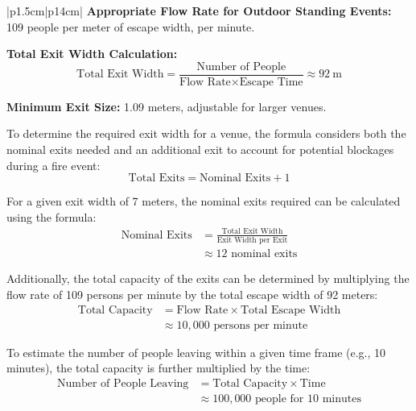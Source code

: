 \begin{longtable}{|p{1.5cm}|p{14cm}|}
                \textbf{Appropriate Flow Rate for Outdoor Standing Events:}
                109 people per meter of escape width, per minute.
    
                \textbf{Total Exit Width Calculation:}
                \[
                    \text{Total Exit Width} = \frac{\text{Number of People}}{\text{Flow Rate} \times \text{Escape Time}} \approx \SI{92}{\metre}
                \]
    
                \textbf{Minimum Exit Size:}
                1.09 meters, adjustable for larger venues.
    
                To determine the required exit width for a venue, the formula considers both the nominal exits needed and an additional exit to account for potential blockages during a fire event:
                \[
                    \text{Total Exits} = \text{Nominal Exits} + 1
                \]
    
                For a given exit width of 7 meters, the nominal exits required can be calculated using the formula:
                \[
                    \begin{aligned}
                    \text{Nominal Exits} &= \frac{\text{Total Exit Width}}{\text{Exit Width per Exit}}\\
                                         &\approx 12 \text{ nominal exits}
                    \end{aligned}
                \]
    
                Additionally, the total capacity of the exits can be determined by multiplying the flow rate of 109 persons per minute by the total escape width of 92 meters:
                \[
                    \begin{aligned}
                    \text{Total Capacity} &= \text{Flow Rate} \times \text{Total Escape Width}\\
                                          &\approx 10,000 \text{ persons per minute}
                    \end{aligned}
                \]
    
                To estimate the number of people leaving within a given time frame (e.g., 10 minutes), the total capacity is further multiplied by the time:
                \[
                    \begin{aligned}
                    \text{Number of People Leaving}
                    &= \text{Total Capacity} \times \text{Time}\\
                    &\approx 100,000 \text{ people for 10 minutes}
                    \end{aligned}
                \]
    

\end{longtable}
